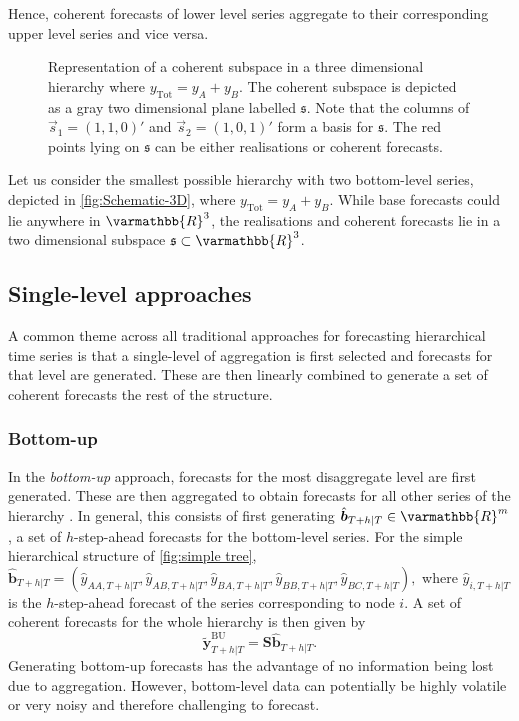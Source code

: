 \documentclass[graybox]{svmult}
\begin{document}
Hence, coherent forecasts of lower level series aggregate to their corresponding upper level series and vice versa.

\begin{figure}[!b]
	\centering
	\vspace{-0.9cm}
	\small
	\resizebox{\linewidth}{!}{
		
	}
	\caption{Representation of a coherent subspace in a three dimensional hierarchy where $y_{\text{Tot}} = y_A + y_B$. The coherent subspace is depicted as a gray two dimensional plane labelled $\mathfrak{s}$. Note that the columns of $\vec{s}_1 = (1,1,0)'$ and $\vec{s}_2 = (1, 0, 1)'$ form a basis for $\mathfrak{s}$. The red points lying on $\mathfrak{s}$ can be either realisations or coherent forecasts.}\label{fig:Schematic-3D}
\end{figure}

Let us consider the smallest possible hierarchy with two bottom-level series, depicted in \autoref{fig:Schematic-3D}, where $y_{\text{Tot}} = y_A + y_B$. While base forecasts could lie anywhere in $\varmathbb{R}^3$, the realisations and coherent forecasts lie in a two dimensional subspace $\mathfrak{s}\subset \varmathbb{R}^3$.

\subsection{Single-level approaches}\label{sec:single level approaches}
A common theme across all traditional approaches for forecasting hierarchical time series is that a single-level of aggregation is first selected and forecasts for that level are generated. These are then linearly combined to generate a set of coherent forecasts the rest of the structure.

\subsubsection{Bottom-up}

In the \textit{bottom-up} approach, forecasts for the most disaggregate level are first generated. These are then aggregated to obtain forecasts for all other series of the hierarchy \citep{dunn1976}. In general, this consists of first generating $\hat{\bm{b}}_{T+h|T} \in \varmathbb{R}^m$, a set of $h$-step-ahead forecasts for the bottom-level series. For the simple hierarchical structure of \autoref{fig:simple tree}, $\hat{\bm{b}}_{T+h|T} = (\hat{{y}}_{AA,T+h|T}, \hat{{y}}_{AB,T+h|T}, \hat{{y}}_{BA,T+h|T}, \hat{{y}}_{BB,T+h|T},\hat{{y}}_{BC,T+h|T}),$ where $\hat{{y}}_{i,T+h|T}$ is the $h$-step-ahead forecast of the series corresponding to node $i$. A set of coherent forecasts for the whole hierarchy is then given by
\begin{equation*}\label{eq:BU}
	\tilde{\bm{y}}^{\text{BU}}_{T+h|T}=\bm{S\hat{\bm{b}}}_{T+h|T}.
\end{equation*}
Generating bottom-up forecasts has the advantage of no information being lost due to aggregation. However, bottom-level data can potentially be highly volatile or very noisy and therefore challenging to forecast.
\end{document}
